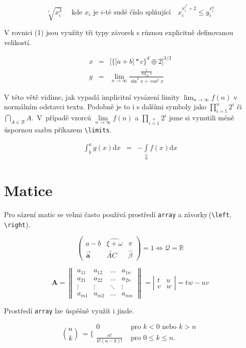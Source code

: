 \documentclass[11pt,a4paper,twocolumn]{article}
\begin{document}
$$
\sqrt[i]{x_{i}^{3}}\quad \text { kde } x_{i} \text { je } i \text {-té sudé číslo splňující}\quad x_{i}^{x_{i}^{i^{2}}+2} \leq y_{i}^{x_{i}^{4}} $$

\par
V rovnici (1) jsou využity tři typy závorek s různou explicitně definovanou velikostí.


\begin{eqnarray}\label{eq1}
    x &=& \bigg[\Big\{\big[a+b\big] * c\Big\}^{d} \oplus 2\bigg]^{3 / 2}\\
    y &=& \lim _{x \rightarrow \infty} \frac{\frac{1}{\log _{10} x}}{\sin ^{2} x+\cos ^{2} x}\nonumber
\end{eqnarray}


V této větě vidíme, jak vypadá implicitní vysázení limity $\lim_{n\to\infty}f(n)$ v normálním odstavci textu. Podobně je to i s dalšími symboly jako $\prod_{i=1}^{n} 2^{i}$ či $\bigcap_{A \in \mathcal{B}}A$.~V~případě vzorců $\lim\limits_{n\to\infty}f(n)$ a $\prod\limits_{i=1}\limits^{n} 2^{i}$ jsme si vynutili méně úspornou sazbu příkazem \verb|\limits|.
\par
\begin{eqnarray}\label{eq2}
\int_{b}^{a} g(x) \mathrm{d}x &=& -\int\limits_{a}\limits^{b} f(x)  \mathrm{d}x
\end{eqnarray}


\section{Matice}
Pro sázení matic se velmi často používá prostředí \texttt{array} a závorky\,(\verb|\left|, \verb|\right|).


$$ \left(\begin{array}{ccc} a-b & \widehat{\xi+\omega} & \pi \\ \vec{\mathbf{a}} & \overleftrightarrow{A C} & \hat{\beta} \end{array}\right)=1 \Longleftrightarrow \mathcal{Q}=\mathbb{R} $$



$$ \mathbf{A}=\left\|\begin{array}{cccc} a_{11} & a_{12} & \ldots & a_{1 n} \\ a_{21} & a_{22} & \ldots & a_{2 n} \\ \vdots & \vdots & \ddots & \vdots \\ a_{m 1} & a_{m 2} & \ldots & a_{m n} \end{array}\right\|=\left|\begin{array}{rllr} t & u \\ v & w \end{array}\right|=tw \!-\! uv $$



Prostředí \texttt{array} lze úspěšně využít i jinde.

\begin{equation*}
 \binom{n}{k}\ = \Bigg\{
\begin{array}{cl}
0 & \text { pro } k<0 \text { nebo } k>n \\
\frac{n !}{k !(n-k) !} & \text { pro } 0 \leq k \leq n.
\end{array}
\end{equation*}
\end{document}
